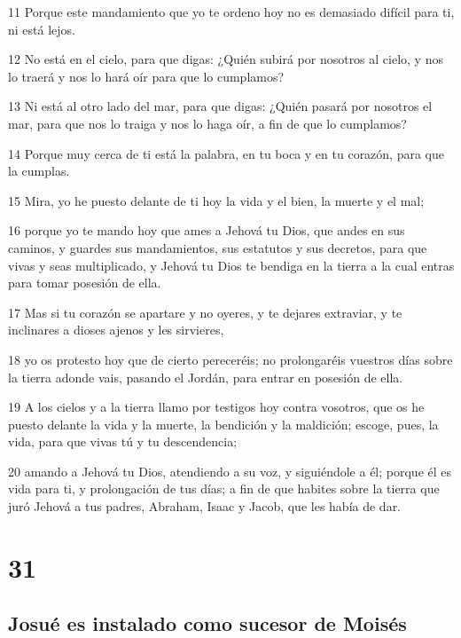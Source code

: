 \par 11 Porque este mandamiento que yo te ordeno hoy no es demasiado difícil para ti, ni está lejos.
\par 12 No está en el cielo, para que digas: ¿Quién subirá por nosotros al cielo, y nos lo traerá y nos lo hará oír para que lo cumplamos?
\par 13 Ni está al otro lado del mar, para que digas: ¿Quién pasará por nosotros el mar, para que nos lo traiga y nos lo haga oír, a fin de que lo cumplamos?
\par 14 Porque muy cerca de ti está la palabra, en tu boca y en tu corazón, para que la cumplas. 
\par 15 Mira, yo he puesto delante de ti hoy la vida y el bien, la muerte y el mal;
\par 16 porque yo te mando hoy que ames a Jehová tu Dios, que andes en sus caminos, y guardes sus mandamientos, sus estatutos y sus decretos, para que vivas y seas multiplicado, y Jehová tu Dios te bendiga en la tierra a la cual entras para tomar posesión de ella.
\par 17 Mas si tu corazón se apartare y no oyeres, y te dejares extraviar, y te inclinares a dioses ajenos y les sirvieres,
\par 18 yo os protesto hoy que de cierto pereceréis; no prolongaréis vuestros días sobre la tierra adonde vais, pasando el Jordán, para entrar en posesión de ella.
\par 19 A los cielos y a la tierra llamo por testigos hoy contra vosotros, que os he puesto delante la vida y la muerte, la bendición y la maldición; escoge, pues, la vida, para que vivas tú y tu descendencia;
\par 20 amando a Jehová tu Dios, atendiendo a su voz, y siguiéndole a él; porque él es vida para ti, y prolongación de tus días; a fin de que habites sobre la tierra que juró Jehová a tus padres, Abraham, Isaac y Jacob, que les había de dar.

\chapter{31}

\section{Josué es instalado como sucesor de Moisés}

